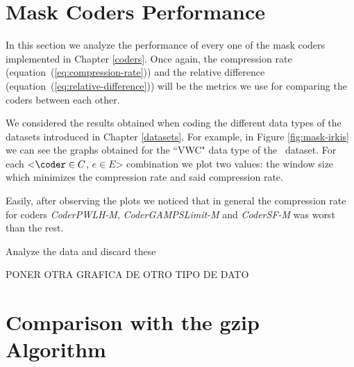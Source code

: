 
















\clearpage
\section{Mask Coders Performance}
\label{secX:codersmask}

In this section we analyze the performance of every one of the mask coders implemented in Chapter \ref{coders}. Once again, the compression rate (equation~(\ref{eq:compression-rate})) and the relative difference (equation~(\ref{eq:relative-difference})) will be the metrics we use for comparing the coders between each other.

We considered the results obtained when coding the different data types of the datasets introduced in Chapter \ref{datasets}. For example, in Figure \ref{fig:mask-irkis} we can see the graphs obtained for the ``VWC" data type of the \datasetirkis \ dataset. For each <$\coder \in C$, $e \in E$> combination we plot two values: the window size which minimizes the compression rate and said compression rate.

Easily, after observing the plots we noticed that in general the compression rate for coders \textit{CoderPWLH-M}, \textit{CoderGAMPSLimit-M} and \textit{CoderSF-M} was worst than the rest.

Analyze the data and discard these 

PONER OTRA GRAFICA DE OTRO TIPO DE DATO

\clearpage


\clearpage



\clearpage

\clearpage







\clearpage
\section{Comparison with the gzip Algorithm}
\label{secX:gzip}